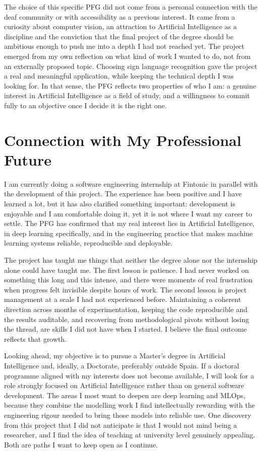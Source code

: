 The choice of this specific PFG did not come from a personal connection with the deaf community or
with accessibility as a previous interest. It came from a curiosity about computer vision, an
attraction to Artificial Intelligence as a discipline and the conviction that the final project of
the degree should be ambitious enough to push me into a depth I had not reached yet. The project
emerged from my own reflection on what kind of work I wanted to do, not from an externally proposed
topic. Choosing sign language recognition gave the project a real and meaningful application, while
keeping the technical depth I was looking for. In that sense, the PFG reflects two properties of
who I am: a genuine interest in Artificial Intelligence as a field of study, and a willingness to
commit fully to an objective once I decide it is the right one.

\section{Connection with My Professional Future}

I am currently doing a software engineering internship at Fintonic in parallel with the development
of this project. The experience has been positive and I have learned a lot, but it has also
clarified something important: development is enjoyable and I am comfortable doing it, yet it is
not where I want my career to settle. The PFG has confirmed that my real interest lies in
Artificial Intelligence, in deep learning specifically, and in the engineering practice that makes
machine learning systems reliable, reproducible and deployable.

The project has taught me things that neither the degree alone nor the internship alone could have
taught me. The first lesson is patience. I had never worked on something this long and this
intense, and there were moments of real frustration when progress felt invisible despite hours of
work. The second lesson is project management at a scale I had not experienced before. Maintaining
a coherent direction across months of experimentation, keeping the code reproducible and the
results auditable, and recovering from methodological pivots without losing the thread, are skills
I did not have when I started. I believe the final outcome reflects that growth.

Looking ahead, my objective is to pursue a Master's degree in Artificial Intelligence and, ideally,
a Doctorate, preferably outside Spain. If a doctoral programme aligned with my interests does not
become available, I will look for a role strongly focused on Artificial Intelligence rather than on
general software development. The areas I most want to deepen are deep learning and MLOps, because
they combine the modelling work I find intellectually rewarding with the engineering rigour needed
to bring those models into reliable use. One discovery from this project that I did not anticipate
is that I would not mind being a researcher, and I find the idea of teaching at university level
genuinely appealing. Both are paths I want to keep open as I continue.


